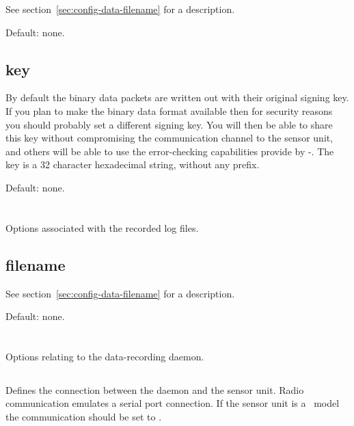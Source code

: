 See section~\ref{sec:config-data-filename} for a description.

Default: none.


\subsection{key}
By default the binary data packets are written out with their original signing
key. If you plan to make the binary data format available then for security
reasons you should probably set a different signing key. You will then be able
to share this key without compromising the communication channel to the sensor
unit, and others will be able to use the error-checking capabilities provide by
\hmac-\mdfive. The key is a 32 character hexadecimal string, without any
 prefix.

Default: none.


\section{\code{[logfile]}}
Options associated with the recorded log files. 

\subsection{filename}

See section~\ref{sec:config-data-filename} for a description.

Default: none.



\section{\code[daemon]}
Options relating to the data-recording daemon.

\subsection{}
Defines the connection between the daemon and the sensor unit. Radio
communication emulates a serial port connection. If the sensor unit is a \PoE\
model the communication should be set to .

